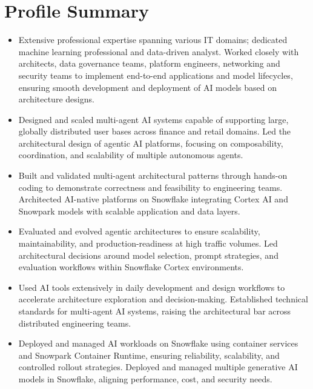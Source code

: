 \vspace{-30pt}
\section*{Profile Summary}
\vspace{-20pt}
\begin{itemize}
  \item Extensive professional expertise spanning various IT domains; dedicated machine learning
        professional and data-driven analyst. Worked closely with architects, data governance teams,
        platform engineers, networking and security teams to implement end-to-end applications and
        model lifecycles, ensuring smooth development and deployment of AI models based on
        architecture designs.

  \item Designed and scaled multi-agent AI systems capable of supporting large, globally distributed
        user bases across finance and retail domains. Led the architectural design of agentic AI
        platforms, focusing on composability, coordination, and scalability of multiple autonomous
        agents.

  \item Built and validated multi-agent architectural patterns through hands-on coding to demonstrate
        correctness and feasibility to engineering teams. Architected AI-native platforms on Snowflake
        integrating Cortex AI and Snowpark models with scalable application and data layers.

  \item Evaluated and evolved agentic architectures to ensure scalability, maintainability, and
        production-readiness at high traffic volumes. Led architectural decisions around model
        selection, prompt strategies, and evaluation workflows within Snowflake Cortex environments.

  \item Used AI tools extensively in daily development and design workflows to accelerate architecture
        exploration and decision-making. Established technical standards for multi-agent AI systems,
        raising the architectural bar across distributed engineering teams.

  \item Deployed and managed AI workloads on Snowflake using container services and Snowpark Container
        Runtime, ensuring reliability, scalability, and controlled rollout strategies. Deployed and
        managed multiple generative AI models in Snowflake, aligning performance, cost, and security
        needs.


\end{itemize}
